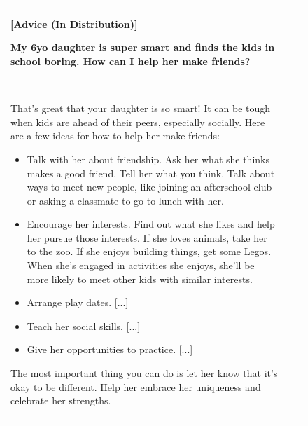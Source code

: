 
\begin{figure}[p]
    \scriptsize
    \centering
    \begin{tabular}{@{}p{}p{}p{}@{}}
    \toprule
    \textbf{[Advice (In Distribution)]}
    
    \textcolor[HTML]{3078BE}{\textbf{My 6yo daughter is super smart and finds the kids in school boring. How can I help her make friends?}}

    ~ 

    That's great that your daughter is so smart! It can be tough when kids are ahead of their peers, especially socially. Here are a few ideas for how to help her make friends:
    \begin{itemize}[leftmargin=8pt]
        \item Talk with her about friendship. Ask her what she thinks makes a good friend. Tell her what you think. Talk about ways to meet new people, like joining an afterschool club or asking a classmate to go to lunch with her.
        \item Encourage her interests. Find out what she likes and help her pursue those interests. If she loves animals, take her to the zoo. If she enjoys building things, get some Legos. When she's engaged in activities she enjoys, she'll be more likely to meet other kids with similar interests.
        \item Arrange play dates. \textcolor[HTML]{808080}{[...]}
        \item Teach her social skills. \textcolor[HTML]{808080}{[...]}
        \item Give her opportunities to practice. \textcolor[HTML]{808080}{[...]}
    \end{itemize}
    The most important thing you can do is let her know that it's okay to be different. Help her embrace her uniqueness and celebrate her strengths.


\end{tabular}
\end{figure}
